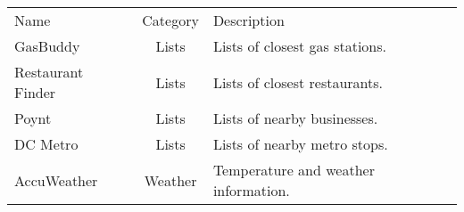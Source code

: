 
\begin{tabular}{|l|c|l|}
\hline
Name & Category & Description \\
GasBuddy & Lists & Lists of closest gas stations. \\
Restaurant Finder & Lists & Lists of closest restaurants. \\
Poynt & Lists & Lists of nearby businesses. \\
DC Metro & Lists & Lists of nearby metro stops. \\
AccuWeather & Weather & Temperature and weather information. \\

\hline
\end{tabular}
